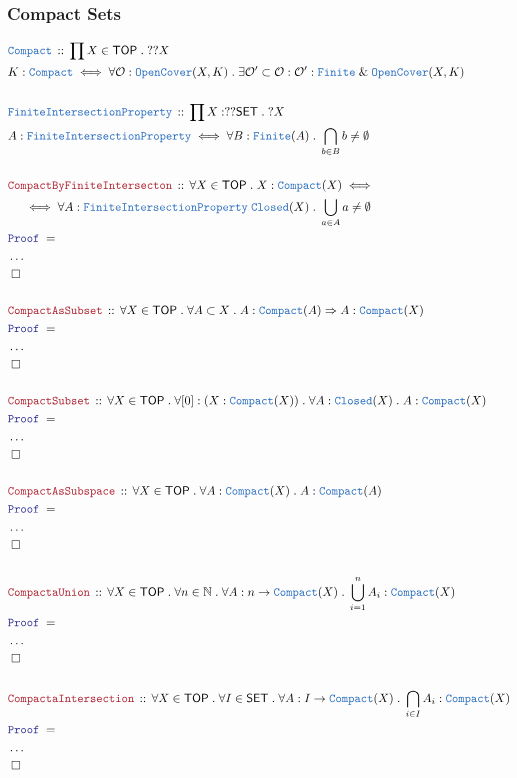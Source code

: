 \documentclass[12pt]{scrartcl}
\newcommand{\TYPE}[1]{\textcolor{NavyBlue}{\mathtt{#1}}}
\newcommand{\LOGIC}[1]{\textcolor{Blue}{\mathtt{#1}}}
\newcommand{\THM}[1]{\textcolor{Maroon}{\mathtt{#1}}}
\renewcommand{\.}{\; . \;}
\newcommand{\Theorem}[2]{& \THM{#1} \, :: \, #2 \\ & \Proof = \\ }
\newcommand{\DeclareType}[2]{& \TYPE{#1} \, :: \, #2 \\}
\newcommand{\DefineType}[3]{& #1 : \TYPE{#2} \iff #3 \\}
\newcommand{\NewLine}{\\ & \kern 1pc}
\newcommand{\Page}[1]{ \begin{align*} #1 \end{align*}   }
\newcommand{\NoProof}{ & \ldots \\ \EndProof}
\renewcommand{\And}{\; \& \;}
\newcommand{\Imply}{\Rightarrow}
\newcommand{\Nat}{\mathbb{N} }
\newcommand{\QED}{\; \square}
\newcommand{\EndProof}{& \QED \\}
\newcommand{\Proof}{\LOGIC{Proof} \; }
\newcommand{\SET}{\mathsf{SET}}
\newcommand{\TOP}{\mathsf{TOP}}
\renewcommand{\O}{\mathcal{O}}
\begin{document}
\subsubsection{Compact Sets}
\Page{
	\DeclareType{Compact}{ \prod X \in \TOP \.  ??X  }
	\DefineType{K}{Compact}{
		\forall \O :\TYPE{OpenCover}(X,K) \. 
		\exists \O' \subset \O : 
		\O' : \TYPE{Finite} \And
			\TYPE{OpenCover}(X,K)
	}
	\\
	\DeclareType{FiniteIntersectionProperty}{ \prod X : ??\SET \. ?X }
	\DefineType{A}{FiniteIntersectionProperty}{
			\forall B : \TYPE{Finite}(A) \.
			\bigcap_{b \in B} b \neq \emptyset
	}
	\\
	\Theorem{CompactByFiniteIntersecton}
	{
		\forall X \in \TOP \.
		X : \TYPE{Compact}(X) 
		\iff \NewLine \iff
		\forall A : \TYPE{FiniteIntersectionProperty} \; \TYPE{Closed}(X) \.
		\bigcup_{a \in A} a \neq \emptyset
	}
	\NoProof
	\\
	\Theorem{CompactAsSubset}
	{
		\forall X \in \TOP \.
		\forall A \subset X \. 
		A : \TYPE{Compact}(A) \Imply A : \TYPE{Compact}(X)
	}
	\NoProof
	\\
	\Theorem{CompactSubset}
	{
		\forall X \in \TOP \.
		\forall [0] : (X : \TYPE{Compact}(X) ) \. 
		\forall A : \TYPE{Closed}(X) \.
		A : \TYPE{Compact}(X)
	}
	\NoProof	
	\\
	\Theorem{CompactAsSubspace}
	{
		\forall X \in \TOP \.
		\forall A : \TYPE{Compact}(X) \. 
		A : \TYPE{Compact}(A)
	}
	\NoProof
	\\
	\Theorem{CompactaUnion}
	{
		\forall X \in \TOP \.
		\forall n \in \Nat \. 
		\forall A : n \to \TYPE{Compact}(X) \.
		\bigcup^n_{i=1} A_i : \TYPE{Compact}(X)
	}
	\NoProof
	\\
	\Theorem{CompactaIntersection}
	{
		\forall X \in \TOP \.
		\forall I \in \SET \. 
		\forall A : I \to \TYPE{Compact}(X) \.
		\bigcap_{i \in I} A_i : \TYPE{Compact}(X)
	}
	\NoProof
}
\end{document}
